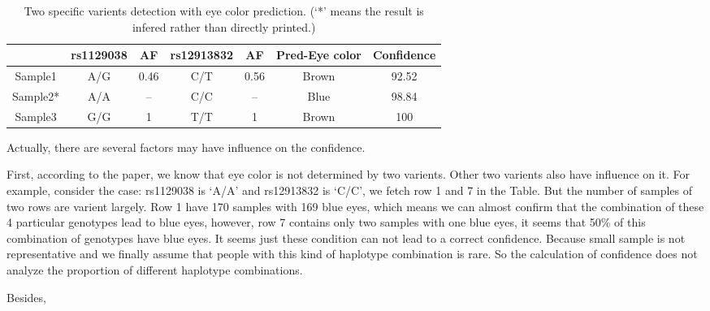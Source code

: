 \documentclass[a4paper]{article}
\begin{document}
\begin{table}[H]
	\small
	\centering
	\begin{tabular}{c|cc|cc|c|c}
		\hline
		& rs1129038 & AF & rs12913832 & AF & Pred-Eye color & Confidence\\	 
		\hline
		Sample1 & A/G  & 0.46 & C/T & 0.56 & Brown & 92.52 \\
		\hline
		Sample2* & A/A & -- & C/C & --  & Blue & 98.84 \\
		\hline
		Sample3 & G/G & 1 & T/T & 1 & Brown & 100 \\
		\hline
	\end{tabular}
	\caption{\label{tab:4}Two specific varients detection with eye color prediction. (`*' means the result is infered rather than directly printed.)}
\end{table}

Actually, there are several factors may have influence on the confidence. 

First, according to the paper, we know that eye color is not determined by two varients. Other two varients also have influence on it. For example, consider the case: rs1129038 is `A/A' and rs12913832 is `C/C', we fetch row 1 and 7 in the Table. But the number of samples of two rows are varient largely. Row 1 have 170 samples with 169 blue eyes, which means we can almost confirm that the combination of these 4 particular genotypes lead to blue eyes, however, row 7 contains only two samples with one blue eyes, it seems that 50\% of this combination of genotypes have blue eyes. It seems just these condition can not lead to a correct confidence. Because small sample is not representative and we finally assume that people with this kind of haplotype combination is rare. So the calculation of confidence does not analyze the proportion of different haplotype combinations.

Besides, 




\end{document}
